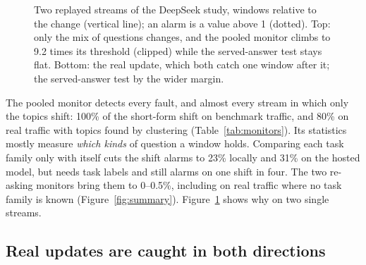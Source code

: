 \documentclass{article}
\begin{document}
\begin{figure}[t]
  \caption{Two replayed streams of the DeepSeek study, windows relative to the
  change (vertical line); an alarm is a value above 1 (dotted). Top: only the mix of
  questions changes, and the pooled monitor climbs to 9.2 times its threshold
  (clipped) while the served-answer test stays flat. Bottom: the real update, which
  both catch one window after it; the served-answer test by the wider margin.}
  \label{fig:streams}
\end{figure}

The pooled monitor detects every fault, and almost every stream in which only the
topics shift: 100\% of the short-form shift on benchmark traffic, and 80\% on real
traffic with topics found by clustering (Table~\ref{tab:monitors}). Its statistics
mostly measure \emph{which kinds} of question a window holds. Comparing each task
family only with itself cuts the shift alarms to 23\% locally and 31\% on the
hosted model, but needs task labels and still alarms on one shift in four. The two
re-asking monitors bring them to 0--0.5\%, including on real traffic where no
task family is known (Figure~\ref{fig:summary}). Figure~\ref{fig:streams} shows
why on two single streams.

\subsection{Real updates are caught in both directions}
\label{sec:api}

\begin{table}[t]
  \centering\small
  \caption{Real changes to hosted models: share of 200 streams alarmed. Accuracy
  change is measured afterwards with the benchmark answers. --: not measurable
  (real traffic has no gradeable answers and no task labels). Last column: the
  served test's range over five replays.}
  \label{tab:updates}
  \setlength{\tabcolsep}{3pt}
\end{table}
\end{document}
